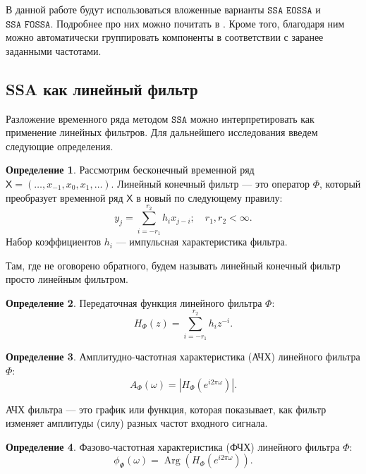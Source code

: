 \documentclass[12pt, specialist, subf
]{disser}
\theoremstyle{definition}
\newcommand{\SSA}{\texttt{SSA}}
\newcommand{\EOSSA}{\texttt{SSA EOSSA}}
\newcommand{\FOSSA}{\texttt{SSA FOSSA}}
\newcommand{\TS}{\mathsf{X}}
\newtheorem{definition}{Определение} %
\begin{document}
В данной работе будут использоваться вложенные варианты $\EOSSA$ и $\FOSSA$. Подробнее про них можно почитать в \cite{golyandina2023intelligent}. Кроме того, благодаря ним можно автоматически группировать компоненты в соответствии с заранее заданными частотами.



\subsection{SSA как линейный фильтр}
Разложение временного ряда методом $\SSA$ можно интерпретировать как применение линейных фильтров. Для дальнейшего исследования введем следующие определения.

\begin{definition}
	Рассмотрим бесконечный временной ряд $\TS = (\dots, x_{-1}, x_0, x_1, \dots)$. Линейный конечный фильтр --- это оператор $\Phi$, который преобразует временной ряд $\TS$ в новый по следующему правилу:
	\begin{equation*}
		y_j = \sum \limits_{i = -r_1}^{r_2} h_i x_{j-i}; \quad r_1, r_2 < \infty.
	\end{equation*}
	Набор коэффициентов ${h_i}$ --- импульсная характеристика фильтра.
\end{definition}

Там, где не оговорено обратного, будем называть линейный конечный фильтр просто линейным фильтром.

\begin{definition}
	Передаточная функция линейного фильтра $\Phi$:
	\begin{equation*}
		H_{\Phi}(z) = \sum \limits_{i = -r_1}^{r_2} h_i z^{-i}.
	\end{equation*}
\end{definition}

\begin{definition}
	Амплитудно-частотная характеристика (АЧХ) линейного фильтра $\Phi$:
	\begin{equation*}
		A_{\Phi}(\omega) = \left| H_{\Phi}\left(e^{i2\pi\omega}\right) \right|.
	\end{equation*}
\end{definition}

АЧХ фильтра  — это график или функция, которая показывает, как фильтр изменяет амплитуды (силу) разных частот входного сигнала.

\begin{definition}
	Фазово-частотная характеристика (ФЧХ) линейного фильтра $\Phi$:
	\begin{equation*}
		\phi_{\Phi}(\omega) = \operatorname{Arg}\left(H_{\Phi}\left(e^{i2\pi\omega}\right)\right).
	\end{equation*}
\end{definition}
\end{document}
